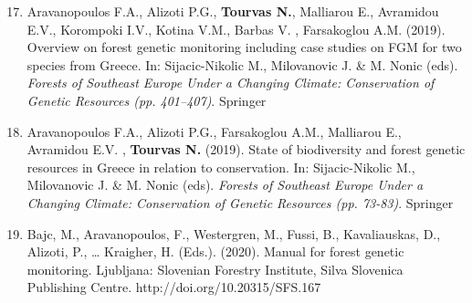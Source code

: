 \documentclass[12pt,]{scrartcl}
\begin{document}
\begin{enumerate}
\setcounter{enumi}{16}
\leftskip-0.07in
\vspace{-3mm}

\item Aravanopoulos F.A., Alizoti P.G., \textbf{Tourvas N.}, Malliarou E., Avramidou E.V., Korompoki I.V., Kotina V.M., Barbas V. ,  Farsakoglou A.M. (2019). Overview on forest genetic monitoring including case studies on FGM for two species from Greece. In: Sijacic-Nikolic M., Milovanovic J. \& M. Nonic (eds). \textit{Forests of Southeast Europe Under a Changing Climate: Conservation of Genetic Resources (pp. 401–407)}. Springer


\item Aravanopoulos F.A., Alizoti P.G., Farsakoglou A.M., Malliarou E., Avramidou E.V. , \textbf{Tourvas N.}  (2019). State of biodiversity and forest genetic resources in Greece in relation to conservation. In: Sijacic-Nikolic M., Milovanovic J. \& M. Nonic (eds). \textit{Forests of Southeast Europe Under a Changing Climate: Conservation of Genetic Resources (pp. 73-83)}. Springer

\item Bajc, M., Aravanopoulos, F., Westergren, M., Fussi, B., Kavaliauskas, D., Alizoti, P., … Kraigher, H. (Eds.). (2020). Manual for forest genetic monitoring. Ljubljana: Slovenian Forestry Institute, Silva Slovenica Publishing Centre. http://doi.org/10.20315/SFS.167
\end{enumerate}




\end{document}
